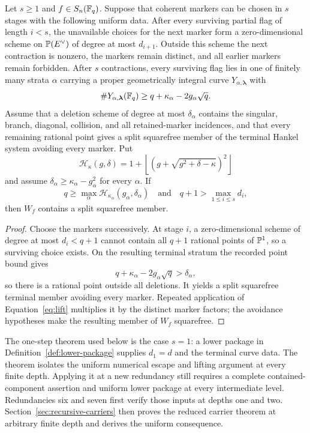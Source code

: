 \begin{theorem}\label{thm:induction}%
%
%
Let \(s\geq1\) and \(f\in S_n(\mathbb F_q)\).  Suppose that coherent markers
can be chosen in \(s\) stages with the following uniform data.
After every surviving partial flag of length \(i<s\), the unavailable
choices for the next marker form a zero-dimensional scheme on
\(\mathbb P(E^\vee)\) of degree at most \(d_{i+1}\).  Outside this scheme
the next contraction is nonzero, the markers remain distinct, and all
earlier markers remain forbidden.  After \(s\) contractions, every
surviving flag lies in one of finitely many strata \(\alpha\) carrying
a proper geometrically integral curve \(Y_{\alpha,\boldsymbol\lambda}\) with
\[
 \#Y_{\alpha,\boldsymbol\lambda}(\mathbb F_q)\geq
 q+\kappa_\alpha-2g_\alpha\sqrt q .
\]
Assume that a deletion scheme of degree at most \(\delta_\alpha\)
contains the singular, branch, diagonal, collision, and all
retained-marker incidences, and that every remaining rational point gives a
split squarefree member of the terminal Hankel system avoiding every
marker.  Put
\[
\mathcal H_\kappa(g,\delta)=
1+\left\lfloor
\left(g+\sqrt{g^2+\delta-\kappa}\right)^2
\right\rfloor
\]
and assume
\(\delta_\alpha\geq\kappa_\alpha-g_\alpha^2\) for every \(\alpha\).
If
\[
q\geq \max_\alpha
\mathcal H_{\kappa_\alpha}(g_\alpha,\delta_\alpha)
\quad\text{and}\quad
q+1>\max_{1\leq i\leq s}d_i,
\]
then \(W_f\) contains a split squarefree member.
\end{theorem}

\begin{proof}
Choose the markers successively.  At stage \(i\), a zero-dimensional
scheme of degree at most \(d_i<q+1\) cannot contain all
\(q+1\) rational points of \(\mathbb P^1\), so a surviving choice exists.
On the resulting terminal stratum the recorded point bound
gives
\[
 q+\kappa_\alpha-2g_\alpha\sqrt q>\delta_\alpha,
\]
so there is a rational point outside all deletions.  It yields a split
squarefree terminal member avoiding every marker.  Repeated application
of Equation~\eqref{eq:lift} multiplies it by the distinct marker factors;
the avoidance hypotheses make the resulting member of \(W_f\)
squarefree.
\end{proof}

The one-step theorem used below is the case \(s=1\): a lower package in
Definition~\ref{def:lower-package} supplies \(d_1=d\) and the terminal
curve data.  The theorem isolates the uniform numerical escape and
lifting argument at every finite depth.  Applying it at a new
redundancy still requires a complete contained-component assertion and
uniform lower package at every intermediate level.  Redundancies six and
seven first verify those inputs at depths one and two.
Section~\ref{sec:recursive-carriers} then proves the reduced carrier theorem
at arbitrary finite depth and derives the uniform consequence.


